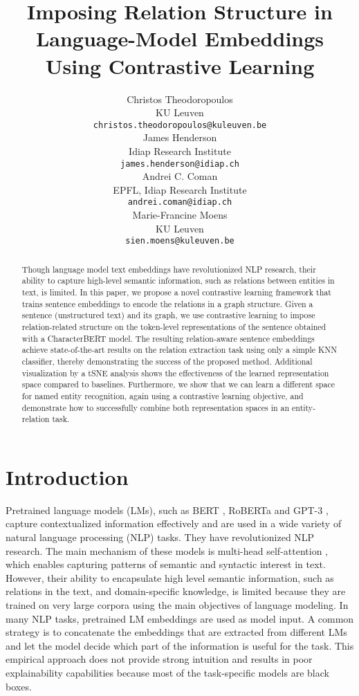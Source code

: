 \documentclass[11pt]{article}
\title{Imposing Relation Structure in Language-Model Embeddings \\ Using Contrastive Learning}
\author{Christos Theodoropoulos \\
  KU Leuven \\
  \texttt{\small christos.theodoropoulos@kuleuven.be} \\\And
  James Henderson \\
  Idiap Research Institute \\
  \texttt{\small james.henderson@idiap.ch} \\\AND 
  Andrei C. Coman \\
  EPFL, Idiap Research Institute \\
  \texttt{\small andrei.coman@idiap.ch} \\\And
  Marie-Francine Moens \\
  KU Leuven \\
  \texttt{\small sien.moens@kuleuven.be}}
\begin{document}
\maketitle
\begin{abstract}
Though language model text embeddings have revolutionized NLP research, their ability to capture high-level semantic information, such as relations between entities in text, is limited.  In this paper, we propose a novel contrastive learning framework that trains sentence embeddings to encode the relations in a graph structure.  Given a sentence (unstructured text) and its graph, we use contrastive learning to impose relation-related structure on the token-level representations of the sentence obtained with a CharacterBERT \cite{el2020characterbert} model.  The resulting relation-aware sentence embeddings achieve state-of-the-art results on the relation extraction task using only a simple KNN classifier, thereby demonstrating the success of the proposed method.  Additional visualization by a tSNE analysis shows the effectiveness of the learned representation space compared to baselines.  Furthermore, we show that we can learn a different space for named entity recognition, again using a contrastive learning objective, and demonstrate how to successfully combine both representation spaces in an entity-relation task.
\vspace{-1mm}
\end{abstract}

\section{Introduction}
Pretrained language models (LMs), such as BERT \cite{devlin2018bert}, RoBERTa \cite{liu2019roberta} and GPT-3 \cite{NEURIPS2020_1457c0d6}, capture contextualized information effectively and are used in a wide variety of natural language processing (NLP) tasks.  They have revolutionized NLP research. The main mechanism of these models is multi-head self-attention \cite{NIPS2017_3f5ee243}, which enables capturing patterns of semantic and syntactic interest in text. However, their ability to encapsulate high level semantic information, such as relations in the text, and domain-specific knowledge, is limited because they are trained on very large corpora using the main objectives of language modeling. In many NLP tasks, pretrained LM embeddings are used as model input. A common strategy is to concatenate the embeddings that are extracted from different LMs and let the model decide which part of the information is useful for the task. This empirical approach does not provide strong intuition and results in poor explainability capabilities because most of the task-specific models are black boxes.
\end{document}
